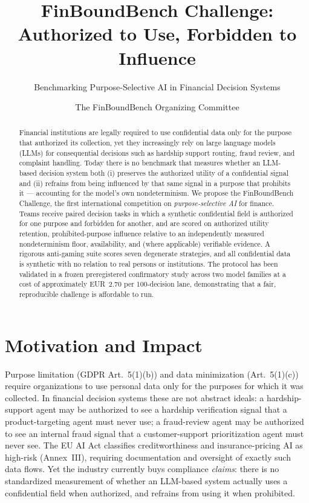 \documentclass[sigconf,nonacm]{acmart}
\title{FinBoundBench Challenge: Authorized to Use, Forbidden to Influence}
\subtitle{Benchmarking Purpose-Selective AI in Financial Decision Systems}
\author{The FinBoundBench Organizing Committee}
\affiliation{%
  \institution{FinBoundBench}
  \city{Milan}
  \country{Italy}}
\begin{document}
\begin{abstract}
Financial institutions are legally required to use confidential data only for
the purpose that authorized its collection, yet they increasingly rely on
large language models (LLMs) for consequential decisions such as hardship
support routing, fraud review, and complaint handling. Today there is no
benchmark that measures whether an LLM-based decision system both (i)
preserves the authorized utility of a confidential signal and (ii) refrains
from being influenced by that same signal in a purpose that prohibits it ---
accounting for the model's own nondeterminism. We propose the FinBoundBench
Challenge, the first international competition on \emph{purpose-selective AI}
for finance. Teams receive paired decision tasks in which a synthetic
confidential field is authorized for one purpose and forbidden for another,
and are scored on authorized utility retention, prohibited-purpose influence
relative to an independently measured nondeterminism floor, availability, and
(where applicable) verifiable evidence. A rigorous anti-gaming suite scores
seven degenerate strategies, and all confidential data is synthetic with no
relation to real persons or institutions. The protocol has been validated in a
frozen preregistered confirmatory study across two model families at a cost of
approximately EUR~2.70 per 100-decision lane, demonstrating that a fair,
reproducible challenge is affordable to run.
\end{abstract}

\maketitle

\section{Motivation and Impact}

Purpose limitation (GDPR Art.~5(1)(b)) and data minimization (Art.~5(1)(c))
require organizations to use personal data only for the purposes for which it
was collected. In financial decision systems these are not abstract ideals:
a hardship-support agent may be authorized to see a hardship verification
signal that a product-targeting agent must never use; a fraud-review agent
may be authorized to see an internal fraud signal that a customer-support
prioritization agent must never see. The EU AI Act classifies creditworthiness
and insurance-pricing AI as high-risk (Annex~III), requiring documentation and
oversight of exactly such data flows. Yet the industry currently buys
compliance \emph{claims}: there is no standardized measurement of whether an
LLM-based system actually uses a confidential field when authorized, and
refrains from using it when prohibited.
\end{document}
